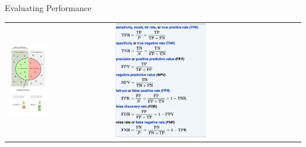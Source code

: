 \documentclass[10pt]{beamer}
\begin{document}
\begin{frame}{Evaluating Performance}
\begin{tabular}{p{5cm} p{7cm}}
    \vspace{0pt}
    \includegraphics[width=0.4\textwidth]{figures/precisionrecall.png}
    &
    \vspace{0pt}
    \includegraphics[width=0.5\textwidth]{figures/precisionrecall-formulas.png}
\end{tabular}
\end{frame}
\end{document}
